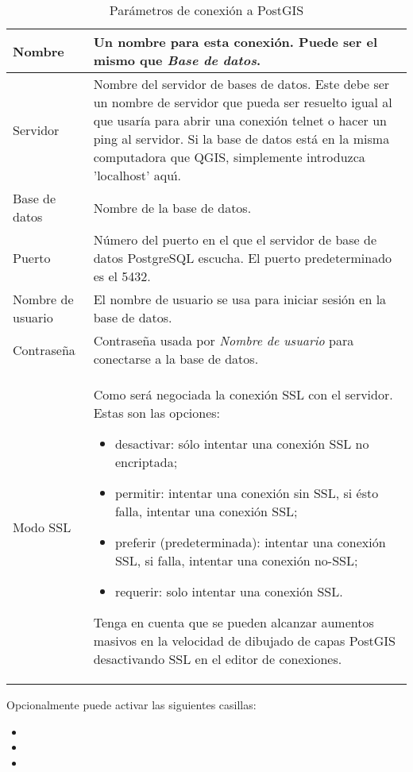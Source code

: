 \begin{table}[ht]
\centering
\caption{Par\'ametros de conexi\'on a PostGIS}\label{tab:postgis_connection_parms}\medskip
 \begin{tabular}{|l|p{5in}|}
\hline Nombre & Un nombre para esta conexi\'on. Puede ser el mismo que \textsl{Base de datos}.
\\
\hline Servidor \index{PostgreSQL!host}
& Nombre del servidor de bases de datos. Este debe ser un nombre de servidor que pueda ser resuelto igual al que usaría
para abrir una conexi\'on telnet o hacer un ping al servidor. Si la base de datos est\'a 
en la misma computadora que QGIS, simplemente introduzca 'localhost' aqu\'{\i}. \\
\hline Base de datos \index{PostgreSQL!database} & Nombre de la base de datos.  \\
\hline Puerto \index{PostgreSQL!port}& N\'umero del puerto en el que el servidor 
de base de datos PostgreSQL escucha. El puerto predeterminado es el 5432.\\
\hline Nombre de usuario \index{PostgreSQL!username}& El nombre de usuario se usa para iniciar sesi\'on
en la base de datos. \\
\hline Contrase\~na \index{PostgreSQL!password}& Contrase\~na usada por
\textsl{Nombre de usuario} para conectarse a la base de datos.\\
\hline Modo SSL \index{PostgreSQL!sslmode}& Como ser\'a negociada la conexi\'on SSL con el servidor. Estas son las opciones: 
\begin {itemize}
\item desactivar: sólo intentar una conexi\'on SSL no encriptada;
\item permitir: intentar una conexi\'on sin SSL, si ésto falla, intentar una conexi\'on SSL;
\item preferir (predeterminada): intentar una conexi\'on SSL, si falla, intentar una conexi\'on no-SSL;
\item requerir: solo intentar una conexi\'on SSL.
\end {itemize}
Tenga en cuenta que se pueden alcanzar aumentos masivos en la velocidad de dibujado de capas PostGIS desactivando SSL en el editor de conexiones. \\
\hline
\end{tabular}
\end{table}

Opcionalmente puede activar las siguientes casillas:

\begin{itemize}
\item {}
\item {}
\item {}
\end{itemize}

